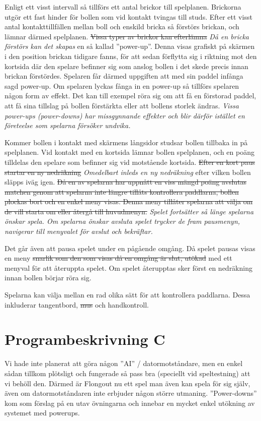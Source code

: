 \documentclass[a4paper,11pt]{article}
\begin{document}
Enligt ett visst intervall så tillförs ett antal brickor till spelplanen. Brickorna utgör ett fast
hinder för bollen som vid kontakt tvingas till studs. Efter ett visst antal kontakttillfällen mellan
boll och enskild bricka så förstörs brickan, och lämnar därmed spelplanen. \sout{Vissa typer av
brickor kan efterlämna} \textit{Då en bricka förstörs kan det skapas} en så kallad ''power-up''. Denna visas
grafiskt på skärmen i den position brickan tidigare fanns, för att sedan förflytta sig i riktning
mot den kortsida där den spelare befinner sig som anslog bollen i det skede precis innan brickan
förstördes. Spelaren får därmed uppgiften att med sin paddel infånga sagd power-up. Om spelaren
lyckas fånga in en power-up så tillförs spelaren någon form av effekt. Det kan till exempel röra sig
om att få en förstorad paddel, att få sina tillslag på bollen förstärkta eller att bollens storlek
ändras. \textit{Vissa power-ups (power-downs) har missgynnande effekter och blir därför istället
en företeelse som spelarna försöker undvika.}

\bigskip
\noindent
Kommer bollen i kontakt med skärmens långsidor studsar bollen tillbaka in på spelplanen. Vid kontakt
med en kortsida lämnar bollen spelplanen, och en poäng tilldelas den spelare som befinner sig vid
motstående kortsida. \sout{Efter en kort paus startar en ny nedräkning} \textit{Omedelbart inleds en
ny nedräkning} efter vilken bollen släpps iväg igen. \sout{Då en av spelarna har uppnått en viss
mängd poäng avslutas matchen genom att spelarna inte längre tillåts kontrollera paddlarna, bollen
plockas bort och en enkel meny visas. Denna meny tillåter spelarna att välja om de vill starta om
eller återgå till huvudmenyn.} \textit{Spelet fortsätter så länge spelarna önskar spela. Om spelarna
önskar avsluta spelet trycker de fram pausmenyn, navigerar till menyvalet för avslut och bekräftar.}

\bigskip
\noindent
Det går även att pausa spelet under en pågående omgång. Då spelet pausas visas en meny \sout{snarlik
som den som visas då en omgång är slut, utökad} med ett menyval för att återuppta spelet. Om spelet
återupptas sker först en nedräkning innan bollen börjar röra sig.

\bigskip
\noindent
Spelarna kan välja mellan en rad olika sätt för att kontrollera paddlarna. Dessa inkluderar
tangentbord, \sout{mus} och handkontroll.

\section{Programbeskrivning C}
Vi hade inte planerat att göra någon ''AI'' / datormotståndare, men en enkel sådan tillkom plötsligt
och fungerade så pass bra (speciellt vid speltestning) att vi behöll den. Därmed är Flongout nu ett
spel man även kan spela för sig själv, även om datormotståndaren inte erbjuder någon större
utmaning. ''Power-downs'' kom som förslag på en utav övningarna och innebar en mycket enkel utökning
av systemet med powerups.
\end{document}
